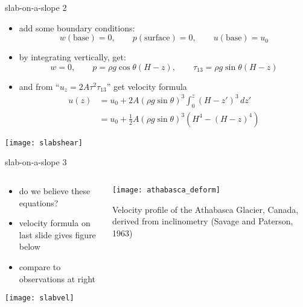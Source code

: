 \begin{frame}{slab-on-a-slope 2}

\begin{itemize}
\item add some boundary conditions:
	$$w(\text{base})=0, \qquad p(\text{surface})=0, \qquad u(\text{base})=u_0$$
\item by integrating vertically, get:
  $$w=0, \qquad p = \rho g \cos\theta (H-z), \qquad \tau_{13} = \rho g \sin\theta (H-z)$$
\item and from ``$u_z = 2 A \tau^2 \tau_{13}$'' get \alert{velocity formula}
\vspace{-0.05in}
\begin{align*}
u(z) &= u_0 + 2 A (\rho g \sin\theta)^3 \int_0^z (H-z')^3\,dz' \\
     &= u_0 + \frac{1}{2} A (\rho g \sin\theta)^3  \left(H^4 - (H-z)^4\right)
\end{align*}
\end{itemize}

\begin{center}
\texttt{[image: slabshear]}
\end{center}
\end{frame}


\begin{frame}{slab-on-a-slope 3}

\begin{columns}
\begin{column}{0.6\textwidth}
\begin{itemize}
\item do we believe these equations?
\item velocity formula on last slide gives figure below
\item compare to observations at right
\end{itemize}
\begin{center}
\texttt{[image: slabvel]}
\end{center}
\end{column}

\begin{column}{0.4\textwidth}
\texttt{[image: athabasca\_deform]}

\medskip
\scriptsize
Velocity profile of the Athabasca Glacier, Canada, derived from inclinometry (Savage and Paterson, 1963)\nocite{SavagePaterson}
\end{column}
\end{columns}
\end{frame}


